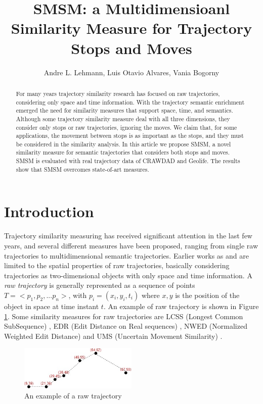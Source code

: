 \documentclass[12pt]{article}
\title{SMSM: a Multidimensioanl Similarity Measure for Trajectory Stops and Moves}
\author{Andre L. Lehmann\inst{1}, Luis Otavio Alvares\inst{1}, Vania Bogorny\inst{1} }
\begin{document}
 

\maketitle

\begin{abstract}
For many years trajectory similarity research has focused on raw trajectories, considering only space and time information. With the trajectory semantic enrichment emerged the need for similarity measures that support space, time, and semantics. Although some trajectory similarity measure deal with all three dimensions, they consider only stops or raw trajectories, ignoring the moves. We claim that, for some applications, the movement between stops is as important as the stops, and they must be considered in the similarity analysis.
  In this article we propose SMSM, a novel similarity measure for semantic trajectories that considers both stops and moves.
  SMSM is evaluated with real trajectory data of CRAWDAD and Geolife. The results show that SMSM overcomes state-of-art measures.
\end{abstract}

\section{Introduction}

Trajectory similarity measuring has received significant attention in the last few years, and several different measures have been proposed, ranging from single raw trajectories to multidimensional semantic trajectories. Earlier works as \cite{vlachos2002discovering} and \cite{Chen:2005:RFS:1066157.1066213} are limited to the spatial properties of raw trajectories, basically considering trajectories as two-dimensional objects with only space and time information. A \emph{raw trajectory} is generally represented as a sequence of points $T=<p_1, p_2, ...p_n>$, with $p_i=(x_i,y_i,t_i)$ where $x,y$ is the position of the object in space at time instant $t$. An example of raw trajectory is shown in Figure \ref{fig:single_trajectory}. Some similarity measures for raw trajectories are LCSS (Longest Common SubSequence) \cite{vlachos2002discovering}, EDR (Edit Distance on Real sequences) \cite{Chen:2005:RFS:1066157.1066213}, NWED (Normalized Weighted Edit Distance) \cite{dodge2012} and UMS (Uncertain Movement Similarity) \cite{Furtado-UMS-2018}.

\begin{figure}[h]
\centering
\includegraphics[width=0.5\textwidth]{Related_Works/Single_trajectory.jpg}
\caption{\label{fig:single_trajectory}An example of a raw trajectory}
\end{figure}
\end{document}

